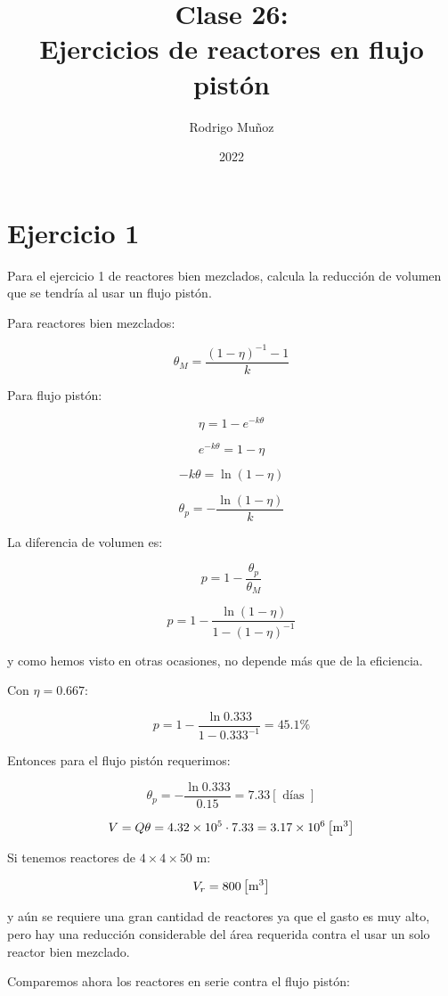 \documentclass[11pt]{article}
\title{Clase 26: \\ Ejercicios de reactores en flujo pistón}
\author{Rodrigo Muñoz}
\date{2022}
\begin{document}
\maketitle

\section{Ejercicio 1}

Para el ejercicio 1 de reactores bien mezclados, calcula la reducción de volumen que se tendría al usar un flujo pistón.

\bigskip \bigskip

Para reactores bien mezclados:

\[ \theta_M = \frac{ \left( 1 - \eta \right) ^ {-1} - 1 }{ k } \]

Para flujo pistón:

\[ \eta = 1 - e^{ -k \theta } \]

\[ e^{ -k \theta } = 1 - \eta \]

\[ - k \theta = \ln \left( 1 - \eta \right) \]

\[ \boxed{ \theta_p = - \frac{ \ln \left( 1 - \eta \right) }{k} } \]

La diferencia de volumen es:

\[ p = 1 - \frac{ \theta_p }{ \theta_M } \]

\[ \boxed{ p = 1 - \frac{ \ln \left( 1 - \eta \right) }{ 1 - \left( 1 - \eta \right)^{-1} } } \]

y como hemos visto en otras ocasiones, no depende más que de la eficiencia.

Con \( \eta = 0.667 \):

\[ p = 1 - \frac{ \ln 0.333 }{ 1 - 0.333^{-1} } = 45.1 \% \]

Entonces para el flujo pistón requerimos:

\[ \theta_p = - \frac{ \ln 0.333 }{ 0.15 } = 7.33 \left[ \text{ días } \right] \]

\[ V = Q \theta = 4.32 \times 10^5 \cdot 7.33 = 3.17 \times 10^6 \left[ \text m ^ 3 \right] \]

Si tenemos reactores de \( 4 \times 4 \times 50 \) m:

\[ V_r = 800 \left[ \text m ^ 3 \right] \]

y aún se requiere una gran cantidad de reactores ya que el gasto es muy alto, pero hay una reducción considerable del área requerida contra el usar un solo reactor bien mezclado.

Comparemos ahora los reactores en serie contra el flujo pistón:
\end{document}
